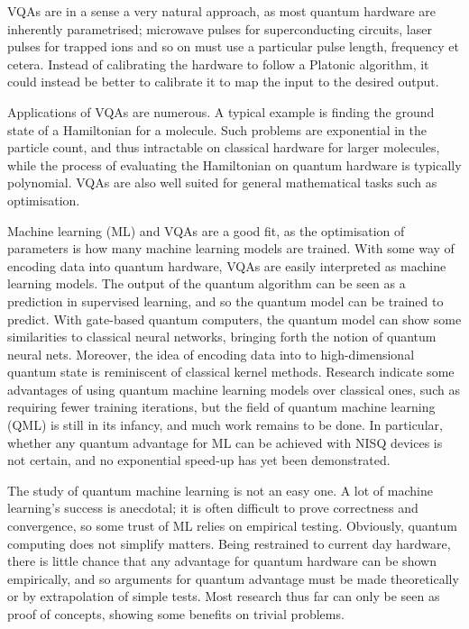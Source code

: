 VQAs are in a sense a very natural approach, as most quantum hardware are inherently parametrised; microwave pulses for superconducting circuits, laser pulses for trapped ions and so on must use a particular pulse length, frequency et cetera.
Instead of calibrating the hardware to follow a Platonic algorithm, it could instead be better to calibrate it to map the input to the desired output.

Applications of VQAs are numerous.
A typical example is finding the ground state of a Hamiltonian for a molecule.
Such problems are exponential in the particle count, and thus intractable on classical hardware for larger molecules, while the process of evaluating the Hamiltonian on quantum hardware is typically polynomial.
VQAs are also well suited for general mathematical tasks such as optimisation.

Machine learning (ML) and VQAs are a good fit, as the optimisation of parameters is how many machine learning models are trained.
With some way of encoding data into quantum hardware, VQAs are easily interpreted as machine learning models.
The output of the quantum algorithm can be seen as a prediction in supervised learning, and so the quantum model can be trained to predict.
With gate-based quantum computers, the quantum model can show some similarities to classical neural networks, bringing forth the notion of quantum neural nets.
Moreover, the idea of encoding data into to high-dimensional quantum state is reminiscent of classical kernel methods.
Research indicate some advantages of using quantum machine learning models over classical ones, such as requiring fewer training iterations, but the field of quantum machine learning (QML) is still in its infancy, and much work remains to be done.
In particular, whether any quantum advantage for ML can be achieved with NISQ devices is not certain, and no exponential speed-up has yet been demonstrated.

The study of quantum machine learning is not an easy one.
A lot of machine learning's success is anecdotal; it is often difficult to prove correctness and convergence, so some trust of ML relies on empirical testing.
Obviously, quantum computing does not simplify matters.
Being restrained to current day hardware, there is little chance that any advantage for quantum hardware can be shown empirically, and so arguments for quantum advantage must be made theoretically or by extrapolation of simple tests.
Most research thus far can only be seen as proof of concepts, showing some benefits on trivial problems.

